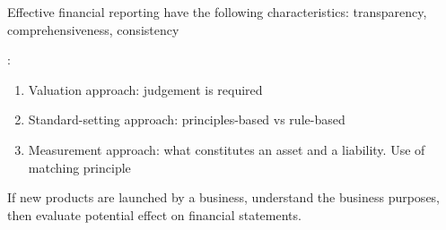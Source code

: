 Effective financial reporting have the following characteristics: transparency, comprehensiveness, consistency

\begin{remark} :
\begin{enumerate}[label=\roman*.]
\setlength{\itemsep}{0pt}
\item Valuation approach: judgement is required
\item Standard-setting approach: principles-based vs rule-based
\item Measurement approach: what constitutes an asset and a liability. Use of matching principle 
\end{enumerate}
\end{remark}

If new products are launched by a business, understand the business purposes, then evaluate potential effect on financial statements.
